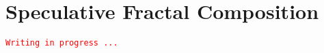 \newpage

\chapter*{Speculative Fractal Composition}

\label{fracdoc}

\texttt{\textcolor{red}{\small Writing in progress ...}}
%



